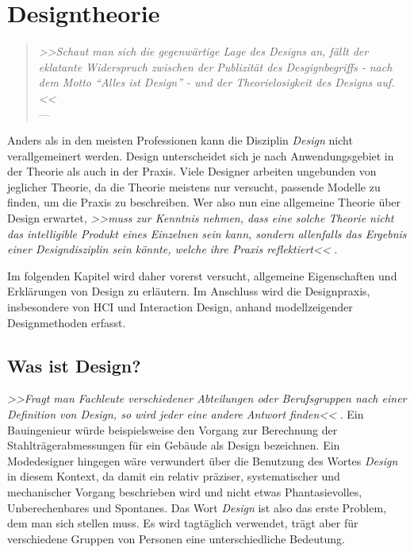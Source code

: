 \chapter{Designtheorie}\label{ch:designTheorie} 

\begin{quote}
	\begin{flushright}{\slshape    
	    >>Schaut man sich die gegenwärtige Lage des Designs an, fällt der eklatante Widerspruch zwischen der Publizität des Desgignbegriffs - nach dem Motto ``Alles ist Design'' - und der Theorielosigkeit des Designs auf.<<} \\ \medskip
	    ---  \citep{Bonsiepe:1992}
	\end{flushright}
\end{quote}

Anders als in den meisten Professionen kann die Disziplin \emph{Design} nicht verallgemeinert werden. Design unterscheidet sich je nach Anwendungsgebiet in der Theorie als auch in der Praxis. Viele Designer arbeiten ungebunden von jeglicher Theorie, da die Theorie meistens nur versucht, passende Modelle zu finden, um die Praxis zu beschreiben. Wer also nun eine allgemeine Theorie über Design erwartet, \emph{>>muss zur Kenntnis nehmen, dass eine solche Theorie nicht das intelligible Produkt eines Einzelnen sein kann, sondern allenfalls das Ergebnis einer Designdisziplin sein könnte, welche ihre Praxis reflektiert<<} \citep{Schneider:2008}.

\medskip Im folgenden Kapitel wird daher vorerst versucht, allgemeine Eigenschaften und Erklärungen von Design zu erläutern. Im Anschluss wird die Designpraxis, insbesondere von \ac{HCI} und Interaction Design, anhand modellzeigender Designmethoden erfasst.

\section{Was ist Design?} 
\emph{>>Fragt man Fachleute verschiedener Abteilungen oder Berufsgruppen nach einer Definition von Design, so wird jeder eine andere Antwort finden<<} \citep{Sagmeister:2008}. Ein Bauingenieur würde beispielsweise den Vorgang zur Berechnung der Stahlträgerabmessungen für ein Gebäude als Design bezeichnen. Ein Modedesigner hingegen wäre verwundert über die Benutzung des Wortes \emph{Design} in diesem Kontext, da damit ein relativ präziser, systematischer und mechanischer Vorgang beschrieben wird und nicht etwas Phantasievolles, Unberechenbares und Spontanes. Das Wort \emph{Design} ist also das erste Problem, dem man sich stellen muss. Es wird tagtäglich verwendet, trägt aber für verschiedene Gruppen von Personen eine unterschiedliche Bedeutung. \citep{Lawson:1997}

